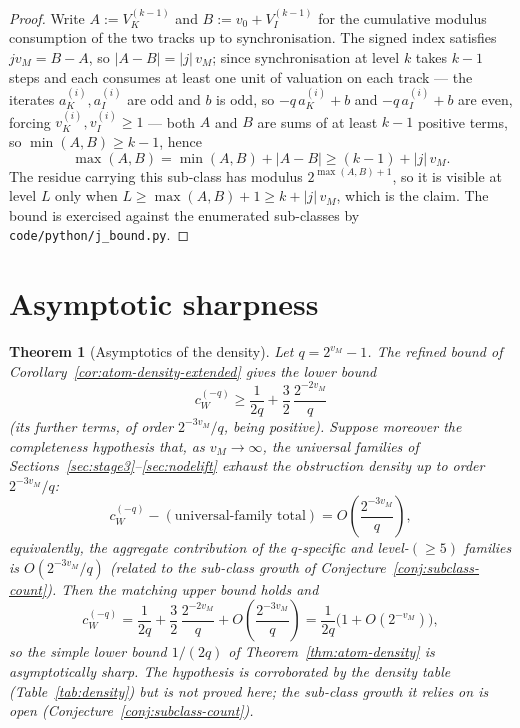 \documentclass[11pt,reqno]{amsart}
\theoremstyle{plain}
\newtheorem{theorem}{Theorem}[section]
\theoremstyle{definition}
\theoremstyle{remark}
\newcommand{\Vk}{V_{K}}
\newcommand{\Vi}{V_{I}}
\newcommand{\vk}{v_{K}}
\newcommand{\vi}{v_{I}}
\newcommand{\aK}{a_{K}}
\newcommand{\aI}{a_{I}}
\newcommand{\vM}{v_{M}}
\newcommand{\cWq}{c_{W}^{(-q)}}
\newcommand{\srcpath}[1]{\nolinkurl{#1}}
\begin{document}
\begin{proof}
Write $A := \Vk^{(k-1)}$ and $B := v_0 + \Vi^{(k-1)}$ for the cumulative
modulus consumption of the two tracks up to synchronisation. The signed index
satisfies $j\vM = B - A$, so $\lvert A - B \rvert = \lvert j \rvert\, \vM$;
since synchronisation at level $k$ takes $k - 1$ steps and each consumes at
least one unit of valuation on each track --- the iterates $\aK^{(i)},
\aI^{(i)}$ are odd and $b$ is odd, so $-q\,\aK^{(i)} + b$ and
$-q\,\aI^{(i)} + b$ are even, forcing $\vk^{(i)}, \vi^{(i)} \ge 1$ --- both
$A$ and $B$ are sums of at
least $k - 1$ positive terms, so $\min(A, B) \ge k - 1$, hence
\[
\max(A, B) = \min(A, B) + \lvert A - B \rvert \ge (k - 1) + \lvert j \rvert\, \vM .
\]
The residue carrying this sub-class has modulus $2^{\max(A,B) + 1}$, so it is
visible at level $L$ only when $L \ge \max(A, B) + 1 \ge k + \lvert j \rvert\,
\vM$, which is the claim. The bound is exercised against the enumerated
sub-classes by \srcpath{code/python/j\_bound.py}.
\end{proof}

\section{Asymptotic sharpness}\label{sec:asymptotics}

\begin{theorem}[Asymptotics of the density]\label{thm:asymptotics}
Let $q = 2^{\vM} - 1$. The refined bound of
Corollary~\ref{cor:atom-density-extended} gives the lower bound
\[
\cWq \ge \frac{1}{2q} + \frac{3}{2}\,\frac{2^{-2\vM}}{q}
\]
(its further terms, of order $2^{-3\vM}/q$, being positive).
Suppose moreover the \emph{completeness hypothesis} that, as
$\vM \to \infty$, the universal families of
Sections~\ref{sec:stage3}--\ref{sec:nodelift} exhaust the obstruction density
up to order $2^{-3\vM}/q$:
\[
\cWq - (\text{universal-family total})
   = O\!\left(\frac{2^{-3\vM}}{q}\right),
\]
equivalently, the aggregate contribution of the $q$-specific and
level-$(\ge 5)$ families is $O(2^{-3\vM}/q)$ (related to the sub-class growth
of Conjecture~\ref{conj:subclass-count}). Then the
matching upper bound holds and
\[
\cWq = \frac{1}{2q} + \frac{3}{2}\,\frac{2^{-2\vM}}{q}
     + O\!\left(\frac{2^{-3\vM}}{q}\right)
     = \frac{1}{2q}\big(1 + O(2^{-\vM})\big),
\]
so the simple lower bound $1/(2q)$ of Theorem~\ref{thm:atom-density} is
asymptotically sharp. The hypothesis is corroborated by the density table
(Table~\ref{tab:density}) but is not proved here; the sub-class growth it
relies on is open (Conjecture~\ref{conj:subclass-count}).
\end{theorem}
\end{document}
